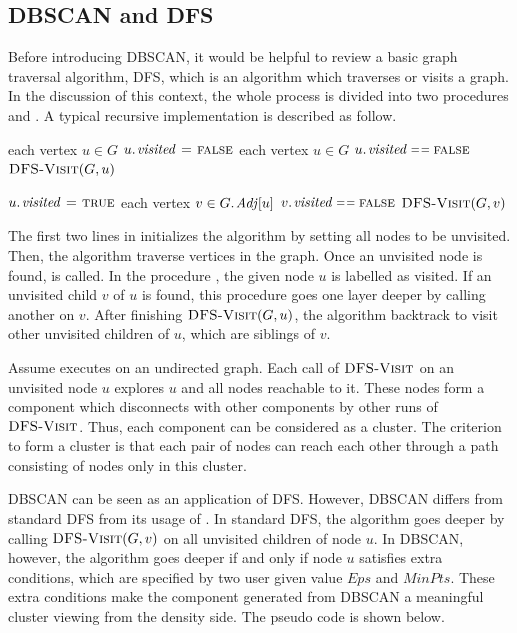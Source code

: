 \subsection{DBSCAN and DFS}
\label{subsec:DBSCANDFS}
Before introducing DBSCAN, it would be helpful to review a basic graph traversal algorithm, DFS, which is an algorithm which traverses or visits a graph. In the discussion of this context, the whole process is divided into two procedures  and . A typical recursive implementation is described as follow. 

\begin{codebox}
\li \For each vertex $u \in G$
\li		\Do
			$\attrib{u}{visited} \gets \const{false}$
	\End
\li	\For each vertex $u \in G$
\li		\Do
		\If \(\attrib{u}{visited} \isequal \const{false}\)
\li			\Then
				$\textnormal{\scshape DFS-Visit}(G, u)$
		\End
	\End
\end{codebox}

\begin{codebox}
\li	$\attrib{u}{visited} \gets \const{true}$
\li	\For each vertex $v \in \attrib{G}{Adj}[u]$
\li	\Do
		\If	$\attrib{v}{visited} \isequal \const{false} $
\li			\Then
				$\textnormal{\scshape DFS-Visit}(G, v)$
		\End
	\End
\end{codebox}

The first two lines in  initializes the algorithm by setting all nodes to be unvisited. Then, the algorithm traverse vertices in the graph. Once an unvisited node is found,  is called. In the procedure , the given node $u$ is labelled as visited. If an unvisited child $v$ of $u$ is found, this procedure goes one layer deeper by calling another  on $v$. After finishing $\textnormal{\scshape DFS-Visit}(G, u)$, the algorithm backtrack to visit other unvisited children of $u$, which are siblings of $v$.

Assume  executes on an undirected graph. Each call of $\textnormal{\scshape DFS-Visit}$ on an unvisited node $u$ explores $u$ and all nodes reachable to it. These nodes form a component which disconnects with other components by other runs of $\textnormal{\scshape DFS-Visit}$. Thus, each component can be considered as a cluster. The criterion to form a cluster is that each pair of nodes can reach each other through a path consisting of nodes only in this cluster.

DBSCAN can be seen as an application of DFS. However, DBSCAN differs from standard DFS from its usage of . In standard DFS, the algorithm goes deeper by calling $\textnormal{\scshape DFS-Visit}(G, v)$ on all unvisited children of node $u$. In DBSCAN, however, the algorithm goes deeper if and only if node $u$ satisfies extra conditions, which are specified by two user given value $Eps$ and $MinPts$. These extra conditions make the component generated from DBSCAN a meaningful cluster viewing from the density side. The pseudo code is shown below.

